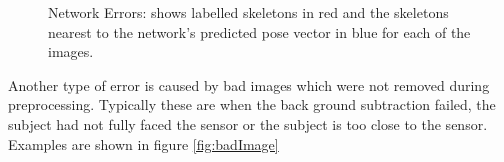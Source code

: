 \documentclass[11pt]{article} %
\begin{document}
\begin{figure}
\qquad%
%
\caption{Network Errors: shows labelled skeletons in red and the skeletons nearest to the network's predicted pose vector in blue for each of the images. }
\label{fig:netErrs}
\end{figure}

Another type of error is caused by bad images which were not removed during preprocessing. Typically these are when the back ground subtraction failed, the subject had not fully faced the sensor or the subject is too close to the sensor. Examples are shown in figure \ref{fig:badImage}
\end{document}
